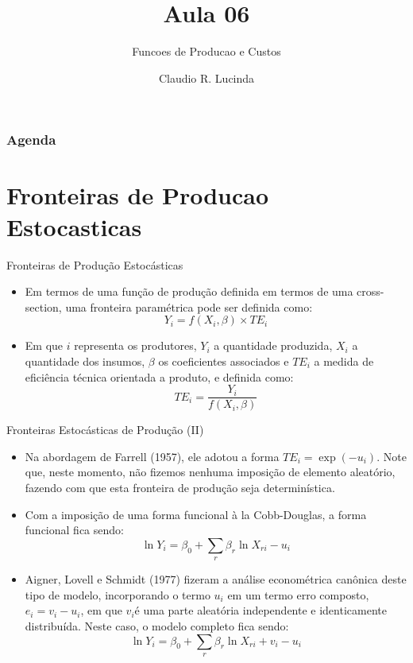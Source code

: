 \documentclass{beamer}
\title{Aula 06}
\subtitle{Funcoes de Producao e Custos}
\author{Claudio R. Lucinda}
\institute{FEA/USP}
\date{}
\begin{document}
\frame{\titlepage}
\begin{frame}\frametitle{Agenda}
  \tableofcontents[pausesections]
\end{frame}

\section{Fronteiras de Producao Estocasticas}
\begin{frame}{Fronteiras de Produção Estocásticas}

\begin{itemize}
\item Em termos de uma função de produção definida em termos de uma cross-section,
uma fronteira paramétrica pode ser definida como:
\[
Y_{i}=f(X_{i},\beta)\times TE_{i}
\]
\item Em que $i$ representa os produtores, $Y_{i}$ a quantidade produzida,
$X_{i}$ a quantidade dos insumos, $\beta$ os coeficientes associados
e $TE_{i}$ a medida de eficiência técnica orientada a produto, e
definida como:
\[
TE_{i}=\frac{Y_{i}}{f(X_{i},\beta)}
\]
\end{itemize}
\end{frame}

\begin{frame}{Fronteiras Estocásticas de Produção (II)}

\begin{itemize}
\item Na abordagem de Farrell (1957), ele adotou a forma $TE_{i}=\exp(-u_{i})$.
Note que, neste momento, não fizemos nenhuma imposição de elemento
aleatório, fazendo com que esta fronteira de produção seja determinística. 
\item Com a imposição de uma forma funcional à la Cobb-Douglas, a forma
funcional fica sendo:
\[
\ln Y_{i}=\beta_{0}+\sum_{r}\beta_{r}\ln X_{ri}-u_{i}
\]
\item Aigner, Lovell e Schmidt (1977) fizeram a análise econométrica canônica
deste tipo de modelo, incorporando o termo $u_{i}$ em um termo erro
composto, $e_{i}=v_{i}-u_{i}$, em que $v_{i}$é uma parte aleatória
independente e identicamente distribuída. Neste caso, o modelo completo
fica sendo:
\[
\ln Y_{i}=\beta_{0}+\sum_{r}\beta_{r}\ln X_{ri}+v_{i}-u_{i}
\]
\end{itemize}
\end{frame}
\end{document}
